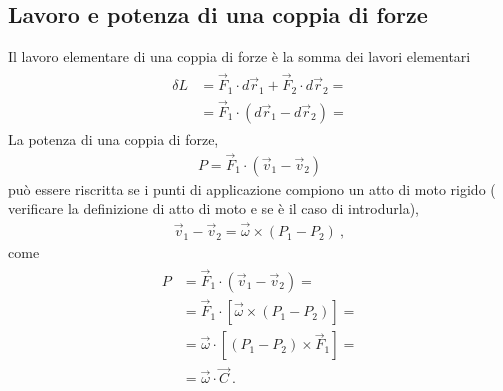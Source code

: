 \documentclass[letterpaper,10pt,italian]{jupyterBook}
\begin{document}
\subsection{Lavoro e potenza di una coppia di forze}
\label{\detokenize{ch/mechanics/actions-work:lavoro-e-potenza-di-una-coppia-di-forze}}
\sphinxAtStartPar
{} Il lavoro elementare di una coppia di forze è la somma dei lavori elementari
\begin{equation*}
\begin{split}\begin{aligned}
  \delta L & = \vec{F}_1 \cdot d \vec{r}_1 + \vec{F}_2 \cdot d \vec{r}_2 = \\
           & = \vec{F}_1 \cdot ( d \vec{r}_1 - d \vec{r}_2 ) = 
\end{aligned}\end{split}
\end{equation*}
\sphinxAtStartPar
{} La potenza di una coppia di forze,
\begin{equation*}
\begin{split}P = \vec{F}_1 \cdot (\vec{v}_1 - \vec{v}_2)\end{split}
\end{equation*}
\sphinxAtStartPar
può essere riscritta se i punti di applicazione compiono un atto di moto rigido ( verificare la definizione di atto di moto e se è il caso di introdurla),
\begin{equation*}
\begin{split}\vec{v}_1 - \vec{v}_2 = \vec{\omega} \times (P_1 - P_2) \ ,\end{split}
\end{equation*}
\sphinxAtStartPar
come
\begin{equation*}
\begin{split}\begin{aligned}
  P & =  \vec{F}_1 \cdot (\vec{v}_1 - \vec{v}_2) = \\
    & =  \vec{F}_1 \cdot \left[ \vec{\omega} \times (P_1 - P_2) \right] = \\
    & =  \vec{\omega} \cdot \left[ (P_1 - P_2) \times \vec{F}_1\right] = \\
    & =  \vec{\omega} \cdot \vec{C} \ . 
\end{aligned}\end{split}
\end{equation*}
\sphinxstepscope
\end{document}
